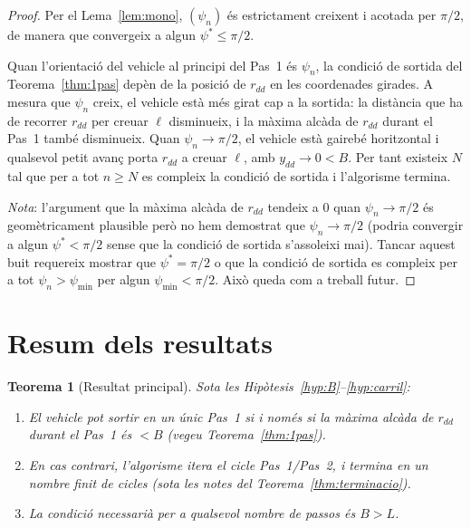 \documentclass[11pt, a4paper]{article}
\theoremstyle{plain}
\newtheorem{theorem}{Teorema}[section]
\theoremstyle{definition}
\begin{document}
\begin{proof}
Per el Lema~\ref{lem:mono}, $(\psi_n)$ \'es estrictament creixent i acotada
per $\pi/2$, de manera que convergeix a algun $\psi^*\leq\pi/2$.

Quan l'orientaci\'o del vehicle al principi del Pas~1 \'es $\psi_n$, la
condici\'o de sortida del Teorema~\ref{thm:1pas} dep\`en de la posici\'o
de $r_{dd}$ en les coordenades girades. A mesura que $\psi_n$ creix, el
vehicle est\`a m\'es girat cap a la sortida: la dist\`ancia que ha de recorrer
$r_{dd}$ per creuar $\ell$ disminueix, i la m\`axima alc\`ada de $r_{dd}$
durant el Pas~1 tamb\'e disminueix. Quan $\psi_n\to\pi/2$, el vehicle
est\`a gaireb\'e horitzontal i qualsevol petit avan\c{c} porta $r_{dd}$ a
creuar $\ell$, amb $y_{dd}\to 0 < B$. Per tant existeix $N$ tal que per a tot
$n\geq N$ es compleix la condici\'o de sortida i l'algorisme termina.

\textit{Nota}: l'argument que la m\`axima alc\`ada de $r_{dd}$ tendeix a $0$
quan $\psi_n\to\pi/2$ \'es geom\`etricament plausible per\`o no hem demostrat
que $\psi_n\to\pi/2$ (podria convergir a algun $\psi^*<\pi/2$ sense que la
condici\'o de sortida s'assoleixi mai). Tancar aquest buit requereix mostrar
que $\psi^*=\pi/2$ o que la condici\'o de sortida es compleix per a tot
$\psi_n>\psi_{\min}$ per algun $\psi_{\min}<\pi/2$. Aix\`o queda com a
treball futur.
\end{proof}

\section{Resum dels resultats}\label{sec:resum}

\begin{theorem}[Resultat principal]\label{thm:principal}
Sota les Hip\`otesis~\ref{hyp:B}--\ref{hyp:carril}:
\begin{enumerate}[noitemsep,label=(\roman*)]
  \item El vehicle pot sortir en un \'unic Pas~1 si i nom\'es si la m\`axima
        alc\`ada de $r_{dd}$ durant el Pas~1 \'es $<B$ (vegeu
        Teorema~\ref{thm:1pas}).
  \item En cas contrari, l'algorisme itera el cicle Pas~1/Pas~2, i termina
        en un nombre finit de cicles (sota les notes del
        Teorema~\ref{thm:terminacio}).
  \item La condici\'o necessari\`a per a qualsevol nombre de passos \'es
        $B>L$.
\end{enumerate}
\end{theorem}
\end{document}
